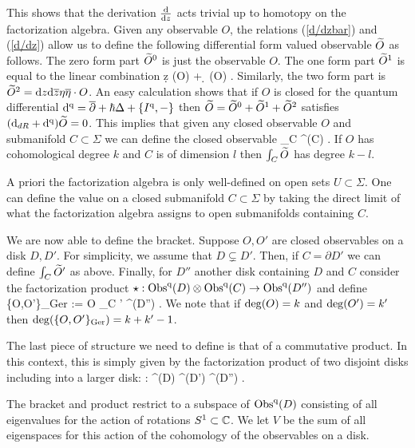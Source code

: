 This shows that the derivation $\frac{\d}{\d z}$ acts trivial up to homotopy on the factorization algebra.
Given any observable $O$, the relations (\ref{d/dzbar}) and (\ref{d/dz}) allow us to define the following differential form valued observable $\Tilde{O}$ as follows. 
The zero form part $\Tilde{O}^{0}$ is just the observable $O$. 
The one form part $\Tilde{O}^1$ is equal to the linear combination
\ben
\d z \; (\eta \cdot O) + \d \zbar \; (\Bar{\eta}\cdot O) . 
\een
Similarly, the two form part is $\Tilde{O}^2 = \d z \d \zbar \eta \Bar{\eta} \cdot O$. 
An easy calculation shows that if $O$ is closed for the quantum differential $\d^\q = \dbar + \hbar \Delta + \{I^\q, -\}$ then $\Tilde{O} = \Tilde{O}^{0} + \Tilde{O}^1 + \Tilde{O}^2$ satisfies $(\d_{dR} + \d^\q) \Tilde{O} = 0$. 
This implies that given any closed observable $O$ and submanifold $C \subset \Sigma$ we can define the closed observable
\ben
\int_C  \in \Obs^\q(C) .
\een
If $O$ has cohomological degree $k$ and $C$ is of dimension $l$ then $\int_C \Tilde{O}$ has degree $k - l$. 

\begin{rmk}
A priori the factorization algebra is only well-defined on open sets $U \subset \Sigma$. 
One can define the value on a closed submanifold $C \subset \Sigma$ by taking the direct limit of what the factorization algebra assigns to open submanifolds containing $C$. 
\end{rmk} 

We are now able to define the bracket. 
Suppose $O,O'$ are closed observables on a disk $D,D'$.
For simplicity, we assume that $D \subsetneq D'$. 
Then, if $C = \partial D'$ we can define $\int_C \Tilde{O}'$ as above. 
Finally, for $D''$ another disk containing $D$ and $C$ consider the factorization product $\star : \Obs^\q(D) \tensor \Obs^\q (C) \to \Obs^\q(D'')$ and define
\ben
\{O,O'\}_{\rm Ger} := O \star \int_C ' \in \Obs^\q (D'') .
\een 
We note that if ${\rm deg}(O) = k$ and ${\rm deg}(O') = k'$ then ${\rm deg}(\{O,O'\}_{\rm Ger}) = k+k' -1$. 

The last piece of structure we need to define is that of a commutative product. 
In this context, this is simply given by the factorization product of two disjoint disks including into a larger disk:
\ben
\cdot : \Obs^\q(D) \tensor \Obs^\q(D') \to \Obs^\q(D'') .
\een 

The bracket and product restrict to a subspace of $\Obs^\q(D)$ consisting of all eigenvalues for the action of rotations $S^1 \subset \CC$. 
We let $V$ be the sum of all eigenspaces for this action of the cohomology of the observables on a disk.

